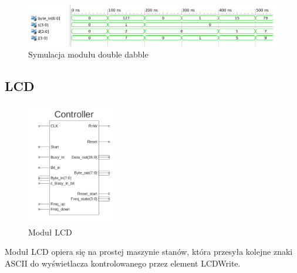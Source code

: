 \documentclass[a4paper]{article}
\begin{document}
\begin{figure}[H]
\begin{center}
\includegraphics[width=16cm]{graphics/double_dabble_symulation.png}
\end{center}
\caption{Symulacja modułu double dabble}
\label{double_dabble_symulation}
\end{figure}

\subsection{LCD}

\begin{figure}[H]
\begin{center}
\includegraphics[width=4cm]{graphics/lcd_sym.png}
\end{center}
\caption{Moduł LCD}
\label{lcd_sym}
\end{figure} 

Moduł LCD opiera się na prostej maszynie stanów, która przesyła kolejne znaki ASCII do wyświetlacza kontrolowanego przez element LCDWrite.
\end{document}
